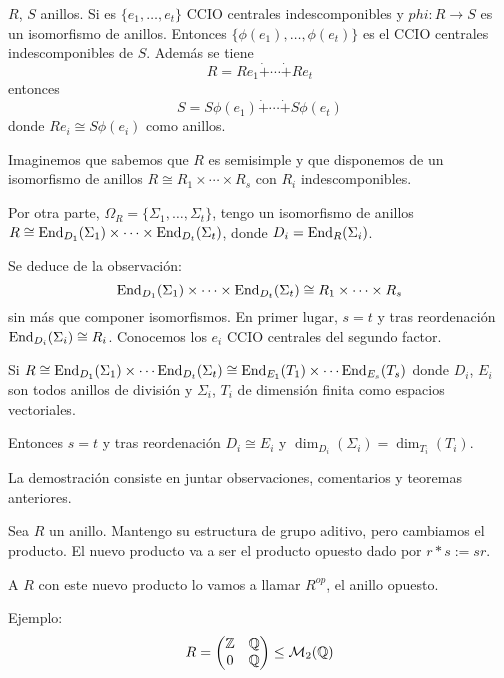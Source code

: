 \begin{obs}
  \(R\), \(S\) anillos. Si es \(\{e_1,\ldots, e_t\}\) CCIO centrales
  indescomponibles y \(phi:R\longrightarrow S\) es un isomorfismo de anillos.
  Entonces \(\{\phi(e_1),\ldots,\phi(e_t)\}\) es el CCIO centrales
  indescomponibles de \(S\). Además se tiene
  \[
    R=Re_1\dot{+}\cdots\dot{+}Re_t
  \]
  entonces
  \[
    S=S\phi(e_1)\dot{+}\cdots\dot{+}S\phi(e_t)
  \]
  donde \(Re_i\cong S\phi(e_i)\) como anillos.
\end{obs}

Imaginemos que sabemos que \(R\) es semisimple y que disponemos de un
isomorfismo de anillos \(R\cong R_1\times\cdots\times R_s\) con \(R_i\)
indescomponibles.

Por otra parte, \(\Omega_R=\{\Sigma_1,\ldots,\Sigma_t\}\), tengo un isomorfismo
de anillos \(R\cong
\operatorname{End}_{D_1}(\Sigma_1)\times\cdots\times\operatorname{End}_{D_t}(\Sigma_t)\), donde
\(D_i=\operatorname{End}_R(\Sigma_i)\).

Se deduce de la observación:
\[
\operatorname{End}_{D_1}(\Sigma_1)\times\cdots\times\operatorname{End}_{D_t}(\Sigma_t)
\cong
R_1\times\cdots\times R_s
\]
sin más que componer isomorfismos. En primer lugar, \(s=t\) y tras
reordenación \(\operatorname{End}_{D_i}(\Sigma_i)\cong R_i\).
Conocemos los \(e_i\) CCIO centrales
del segundo factor.

\begin{teo}
  Si \(R\cong\operatorname{End}_{D_1}(\Sigma_1)\times\cdots\operatorname{End}_{D_t}(\Sigma_t)
  \cong\operatorname{End}_{E_1}(T_1)\times\cdots\operatorname{End}_{E_s}(T_s)\)
  donde \(D_i\), \(E_i\) son todos anillos de división y \(\Sigma_i\),
  \(T_i\) de dimensión finita como espacios vectoriales.

  Entonces \(s=t\) y tras reordenación \(D_i\cong E_i\) y
  \(\dim_{D_i}(\Sigma_i)=\dim_{T_i}(T_i)\).
\end{teo}

La demostración consiste en juntar observaciones, comentarios
y teoremas anteriores.

\begin{df}
Sea \(R\) un anillo. Mantengo su estructura de grupo aditivo, pero cambiamos
el producto. El nuevo producto va a ser el producto opuesto dado por
\(r*s:=sr\).

  A \(R\) con este nuevo producto lo vamos a llamar \(R^{op}\), el anillo
  opuesto.
\end{df}

Ejemplo: \[
  R=
  \begin{pmatrix}
    \mathbb{Z}&\mathbb{Q}\\
    0&\mathbb{Q}
  \end{pmatrix}
  \le \mathcal{M}_2(\mathbb{Q})
\]

